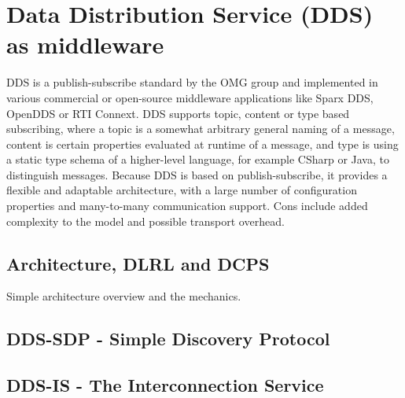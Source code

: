 \section{Data Distribution Service (DDS) as middleware}

DDS is a publish-subscribe standard by the OMG group and implemented in various commercial or open-source middleware applications like Sparx DDS, OpenDDS or RTI Connext. DDS supports topic, content or type based subscribing, where a topic is a somewhat arbitrary general naming of a message, content is certain properties evaluated at runtime of a message, and type is using a static type schema of a higher-level language, for example CSharp or Java, to distinguish messages. Because DDS is based on publish-subscribe, it provides a flexible and adaptable architecture, with a large number of configuration properties and many-to-many communication support. Cons include added complexity to the model and possible transport overhead.

\subsection{Architecture, DLRL and DCPS}

Simple architecture overview and the mechanics.

\subsection{DDS-SDP - Simple Discovery Protocol}

\subsection{DDS-IS - The Interconnection Service}